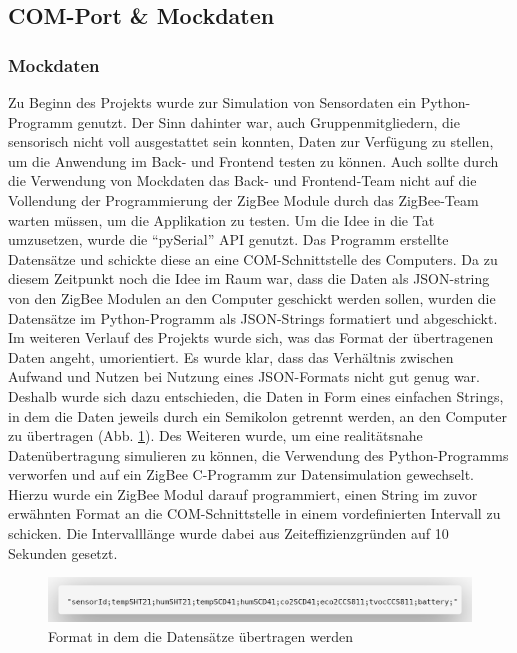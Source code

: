 \documentclass[]{article}
\begin{document}
			\subsection{COM-Port \& Mockdaten}
			
			\subsubsection{Mockdaten}
			Zu Beginn des Projekts wurde zur Simulation von Sensordaten ein Python-Programm genutzt. Der Sinn dahinter war, auch Gruppenmitgliedern, die sensorisch nicht voll ausgestattet sein konnten, Daten zur Verfügung zu stellen, um die Anwendung im Back- und Frontend testen zu können. Auch sollte durch die Verwendung von Mockdaten das Back- und Frontend-Team nicht auf die Vollendung der Programmierung der ZigBee Module durch das ZigBee-Team warten müssen, um die Applikation zu testen.\newline			
Um die Idee in die Tat umzusetzen, wurde die “pySerial” API genutzt. Das Programm erstellte Datensätze und schickte diese an eine COM-Schnittstelle des Computers. Da zu diesem Zeitpunkt noch die Idee im Raum war, dass die Daten als JSON-string von den ZigBee Modulen an den Computer geschickt werden sollen, wurden die Datensätze im Python-Programm als JSON-Strings formatiert und abgeschickt.\newline
Im weiteren Verlauf des Projekts wurde sich, was das Format der übertragenen Daten angeht, umorientiert. Es wurde klar, dass das Verhältnis zwischen Aufwand und Nutzen bei Nutzung eines JSON-Formats nicht gut genug war. Deshalb wurde sich dazu entschieden, die Daten in Form eines einfachen Strings, in dem die Daten jeweils durch ein Semikolon getrennt werden, an den Computer zu  übertragen (Abb. \ref{img:data_format}). Des Weiteren wurde, um eine realitätsnahe Datenübertragung simulieren zu können, die Verwendung des Python-Programms verworfen und auf ein ZigBee C-Programm zur Datensimulation gewechselt. Hierzu wurde ein ZigBee Modul darauf programmiert, einen String im zuvor erwähnten Format an die COM-Schnittstelle in einem vordefinierten Intervall zu schicken. Die Intervalllänge wurde dabei aus Zeiteffizienzgründen auf 10 Sekunden gesetzt.
					\begin{figure}[!h]
						\centering
						\includegraphics[scale=0.223]{images/data_format}
						\caption{Format in dem die Datensätze übertragen werden}
						\label{img:data_format}
					\end{figure}
\end{document}
